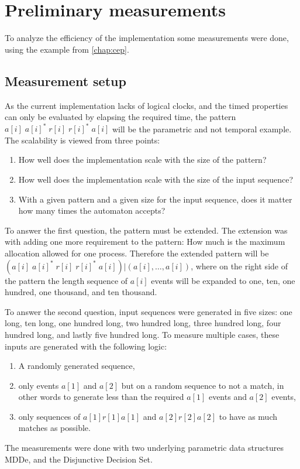 \section{Preliminary measurements}
    To analyze the efficiency of the implementation some measurements were done, using the example from \cref{chap:cep}.
    
    \subsection{Measurement setup}
    As the current implementation lacks of logical clocks, and the timed properties can only be evaluated by elapsing the required time, the pattern $a[i] \; a[i]^\ast \; r[i] \; r[i]^\ast \; a[i]$ will be the parametric and not temporal example.
    The scalability is viewed from three points:
    
    \begin{enumerate}
        \label{algo:meas:setup}
        \item How well does the implementation scale with the size of the pattern?
        \item How well does the implementation scale with the size of the input sequence?
        \item With a given pattern and a given size for the input sequence, does it matter how many times the automaton accepts?
    \end{enumerate}
    
    To answer the first question, the pattern must be extended. The extension was with adding one more requirement to the pattern: How much is the maximum allocation allowed for one process. Therefore the extended pattern will be $ ( a[i] \; a[i]^\ast \; r[i] \; r[i]^\ast \; a[i] ) | (a[i],\dots,a[i])$, where on the right side of the pattern the length sequence of $a[i]$ events will be expanded to one, ten, one hundred, one thousand, and ten thousand.
    
    To answer the second question, input sequences were generated in five sizes: one long, ten long, one hundred long, two hundred long, three hundred long, four hundred long, and lastly five hundred long.
    To measure multiple cases, these inputs are generated with the following logic:
    \begin{enumerate}
        \item A randomly generated sequence,
        \item only events $a[1]$ and $a[2]$ but on a random sequence to not a match, in other words to generate less than the required $a[1]$ events and $a[2]$ events,
        \item only sequences of $a[1] r[1] a[1]$ and $a[2] r[2] a[2]$ to have as much matches as possible.
    \end{enumerate}
    The measurements were done with two underlying parametric data structures MDDe, and the  Disjunctive Decision Set.
    

